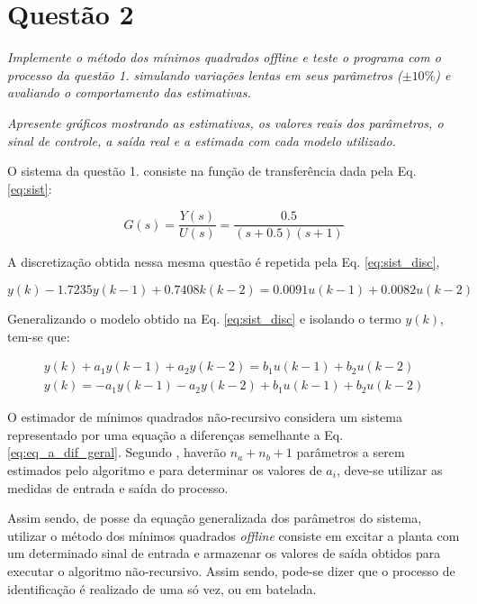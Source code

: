 \chapter*{Questão 2}

{\it Implemente o método dos mínimos quadrados offline e teste o programa com o
processo da questão 1. simulando variações lentas em seus parâmetros ($\pm
10\%$) e avaliando o comportamento das estimativas.}

{\it Apresente gráficos mostrando as estimativas, os valores reais dos
parâmetros, o sinal de controle, a saída real e a estimada com cada modelo
utilizado.}

\vspace{0.5cm}


\vspace{0.25cm}

O sistema da questão 1. consiste na função de transferência dada pela Eq.
\ref{eq:sist}:

\begin{equation}\label{eq:sist}
G(s) = \frac{Y(s)}{U(s)} = \frac{0.5}{(s + 0.5)(s + 1)}
\end{equation}

A discretização obtida nessa mesma questão é repetida pela Eq.
\ref{eq:sist_disc},

\begin{equation}\label{eq:sist_disc}
y(k) - 1.7235y(k-1) + 0.7408k(k-2) = 0.0091u(k-1) + 0.0082u(k-2)
\end{equation}

Generalizando o modelo obtido na Eq. \ref{eq:sist_disc} e isolando o termo
$y(k)$, tem-se que:

\begin{eqnarray}
y(k) + a_1 y(k-1) + a_2 y(k-2) = b_1 u(k-1) + b_2 u(k-2)\nonumber\\
y(k) = - a_1 y(k-1) - 
         a_2 y(k-2) + 
         b_1 u(k-1) + 
         b_2u(k-2)\label{eq:eq_a_dif_geral}
\end{eqnarray}

O estimador de mínimos quadrados não-recursivo considera um sistema representado
por uma equação a diferenças semelhante a Eq. \ref{eq:eq_a_dif_geral}. Segundo
, haverão $n_a + n_b + 1$ parâmetros a serem estimados
pelo algoritmo e para determinar os valores de $a_i$, deve-se utilizar as
medidas de entrada e saída do processo.

Assim sendo, de posse da equação generalizada dos parâmetros do sistema,
utilizar o método dos mínimos quadrados {\it offline} consiste em excitar a
planta com um determinado sinal de entrada e armazenar os valores de saída
obtidos para executar o algoritmo não-recursivo. Assim sendo, pode-se dizer que
o processo de identificação é realizado de uma só vez, ou em batelada.

